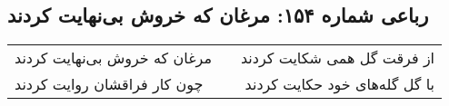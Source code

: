 \begin{center}
\section*{رباعی شماره ۱۵۴: مرغان که خروش بی‌نهایت کردند}
\label{sec:sh154}
\begin{longtable}{l p{0.5cm} r}
مرغان که خروش بی‌نهایت کردند
&&
از فرقت گل همی شکایت کردند
\\
چون کار فراقشان روایت کردند
&&
با گل گله‌های خود حکایت کردند
\\
\end{longtable}
\end{center}
